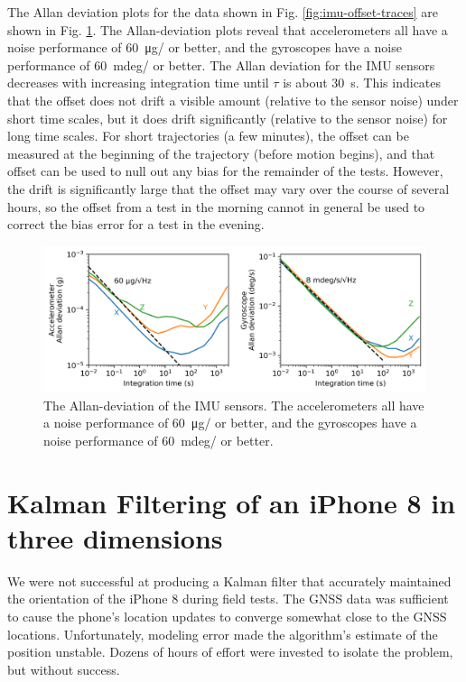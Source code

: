 \documentclass[10pt]{article}
\begin{document}
The Allan deviation plots for the data shown in Fig. \ref{fig:imu-offset-traces} are shown in Fig. \ref{fig:allan-deviation}. The Allan-deviation plots reveal that accelerometers all have a noise performance of \SI{60}{\micro g/} or better, and the gyroscopes have a noise performance of \SI{60}{mdeg/} or better. The Allan deviation for the IMU sensors decreases with increasing integration time until $\tau$ is about \SI{30}{s}. This indicates that the offset does not drift a visible amount (relative to the sensor noise) under short time scales, but it does drift significantly (relative to the sensor noise) for long time scales. For short trajectories (a few minutes), the offset can be measured at the beginning of the trajectory (before motion begins), and that offset can be used to null out any bias for the remainder of the tests. However, the drift is significantly large that the offset may vary over the course of several hours, so the offset from a test in the morning cannot in general be used to correct the bias error for a test in the evening.

\begin{figure}
  \centering
  \includegraphics[width=\textwidth]{../images/allan-deviation2.png}
  \caption{\label{fig:allan-deviation} The Allan-deviation of the IMU sensors. The accelerometers all have a noise performance of \SI{60}{\micro g/} or better, and the gyroscopes have a noise performance of \SI{60}{mdeg/} or better.}
\end{figure}

\section{Kalman Filtering of an iPhone 8 in three dimensions}

We were not successful at producing a Kalman filter that accurately maintained the orientation of the iPhone 8 during field tests. The GNSS data was sufficient to cause the phone's location updates to converge somewhat close to the GNSS locations. Unfortunately, modeling error made the algorithm's estimate of the position unstable. Dozens of hours of effort were invested to isolate the problem, but without success.
\end{document}
